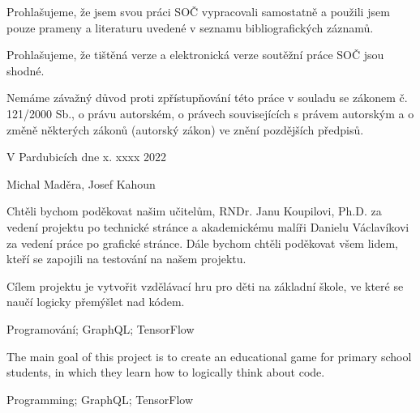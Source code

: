 
\noindent Prohlašujeme, že jsem svou práci SOČ vypracovali samostatně a použili jsem pouze prameny a literaturu uvedené v seznamu bibliografických záznamů.

\noindent Prohlašujeme, že tištěná verze a elektronická verze soutěžní práce SOČ jsou shodné. 

\noindent Nemáme závažný důvod proti zpřístupňování této práce v souladu se zákonem č. 121/2000 Sb., o právu autorském, o právech souvisejících s právem autorským a o změně některých zákonů (autorský zákon) ve znění pozdějších předpisů. 

\vspace{24 pt}

\noindent V Pardubicích dne x. xxxx 2022 \dotfill{} 

\hspace{6cm} Michal Maděra, Josef Kahoun

\cleardoublepage

\vspace*{0.8\textheight}

\noindent
Chtěli bychom poděkovat našim učitelům, RNDr. Janu Koupilovi, Ph.D. za vedení projektu po technické stránce a akademickému malíři Danielu Václavíkovi za vedení práce po grafické stránce. Dále bychom chtěli poděkovat všem lidem, kteří se zapojili na testování na našem projektu.

\cleardoublepage


\noindent Cílem projektu je vytvořit vzdělávací hru pro děti na základní škole, ve které se naučí logicky přemýšlet nad kódem.

\vspace{18pt}


\noindent Programování; GraphQL; TensorFlow 

\vspace{18pt}


\noindent The main goal of this project is to create an educational game for primary school students, in which they learn how to logically think about code.

\vspace{18pt}


\noindent Programming; GraphQL; TensorFlow

\cleardoublepage

\tableofcontents